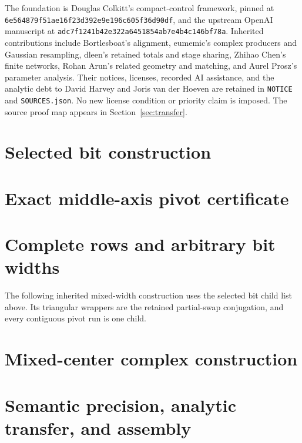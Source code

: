 \documentclass[11pt]{article}
\begin{document}
The foundation is Douglas Colkitt's compact-control framework, pinned
at \texttt{6e564879f51ae16f23d392e9e196c605f36d90df}, and the upstream
OpenAI manuscript at \texttt{adc7f1241b42e322a6451854ab7e4b4c146bf78a}.
Inherited contributions include Bortlesboat's alignment, eumemic's
complex producers and Gaussian resampling, dleen's retained totals and
stage sharing, Zhihao Chen's finite networks, Rohan Arun's related
geometry and matching, and Aurel Prosz's parameter analysis.
Their notices, licenses, recorded AI assistance, and the analytic debt
to David Harvey and Joris van der Hoeven are retained in \texttt{NOTICE}
and \texttt{SOURCES.json}. No new license condition or priority claim
is imposed. The source proof map appears in Section~\ref{sec:transfer}.

\section{Selected bit construction}

\section{Exact middle-axis pivot certificate}

\section{Complete rows and arbitrary bit widths}
The following inherited mixed-width construction uses the selected bit
child list above. Its triangular wrappers are the retained partial-swap
conjugation, and every contiguous pivot run is one child.

\section{Mixed-center complex construction}

\section{Semantic precision, analytic transfer, and assembly}

\end{document}
